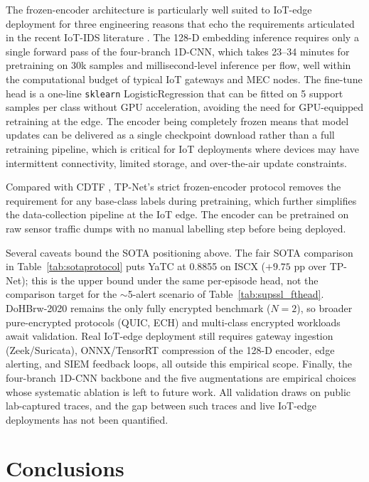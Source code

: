 \documentclass[sensors,article,submit,moreauthors]{Definitions/mdpi}
\begin{document}
The frozen-encoder architecture is particularly well suited to IoT-edge deployment for three engineering reasons that echo the requirements articulated in the recent IoT-IDS literature \cite{liu2025iot}. The 128-D embedding inference requires only a single forward pass of the four-branch 1D-CNN, which takes 23--34 minutes for pretraining on 30k samples and millisecond-level inference per flow, well within the computational budget of typical IoT gateways and MEC nodes. The fine-tune head is a one-line \texttt{sklearn} LogisticRegression that can be fitted on 5 support samples per class without GPU acceleration, avoiding the need for GPU-equipped retraining at the edge. The encoder being completely frozen means that model updates can be delivered as a single checkpoint download rather than a full retraining pipeline, which is critical for IoT deployments where devices may have intermittent connectivity, limited storage, and over-the-air update constraints.

Compared with CDTF \cite{lu2026cdtf}, TP-Net's strict frozen-encoder protocol removes the requirement for any base-class labels during pretraining, which further simplifies the data-collection pipeline at the IoT edge. The encoder can be pretrained on raw sensor traffic dumps with no manual labelling step before being deployed.

Several caveats bound the SOTA positioning above. The fair SOTA comparison in Table~\ref{tab:sotaprotocol} puts YaTC at 0.8855 on ISCX ($+9.75$ pp over TP-Net); this is the upper bound under the same per-episode head, not the comparison target for the $\sim$5-alert scenario of Table~\ref{tab:supssl_fthead}. DoHBrw-2020 remains the only fully encrypted benchmark ($N=2$), so broader pure-encrypted protocols (QUIC, ECH) and multi-class encrypted workloads await validation. Real IoT-edge deployment still requires gateway ingestion (Zeek/Suricata), ONNX/TensorRT compression of the 128-D encoder, edge alerting, and SIEM feedback loops, all outside this empirical scope. Finally, the four-branch 1D-CNN backbone and the five augmentations are empirical choices whose systematic ablation is left to future work. All validation draws on public lab-captured traces, and the gap between such traces and live IoT-edge deployments has not been quantified.

\section{Conclusions}
\label{sec:conclusion}
\end{document}

